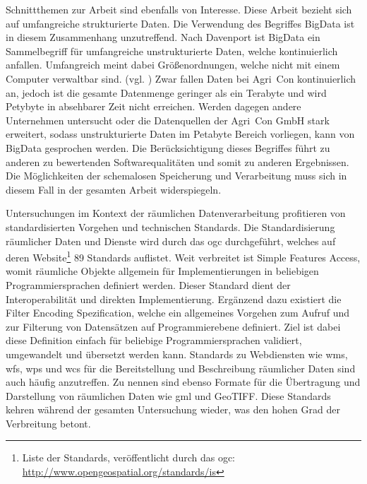 Schnittthemen zur Arbeit sind ebenfalls von Interesse.
Diese Arbeit bezieht sich auf umfangreiche strukturierte Daten.
Die Verwendung des Begriffes BigData ist in diesem Zusammenhang unzutreffend.
Nach Davenport ist BigData ein Sammelbegriff für umfangreiche unstrukturierte Daten, welche kontinuierlich anfallen.
Umfangreich meint dabei Größenordnungen, welche nicht mit einem Computer verwaltbar sind. (vgl. \cite[S.1]{book:bigdata})
Zwar fallen Daten bei Agri~Con kontinuierlich an, jedoch ist die gesamte Datenmenge geringer als ein Terabyte und wird Petybyte in absehbarer Zeit nicht erreichen.
Werden dagegen andere Unternehmen untersucht oder die Datenquellen der Agri~Con GmbH stark erweitert, sodass unstrukturierte Daten im Petabyte Bereich vorliegen, kann von BigData gesprochen werden.
Die Berücksichtigung dieses Begriffes führt zu anderen zu bewertenden Softwarequalitäten und somit zu anderen Ergebnissen.
Die Möglichkeiten der schemalosen Speicherung und Verarbeitung muss sich in diesem Fall in der gesamten Arbeit widerspiegeln.

Untersuchungen im Kontext der räumlichen Datenverarbeitung profitieren von standardisierten Vorgehen und technischen Standards.
Die Standardisierung räumlicher Daten und Dienste wird durch das \Gls{ogc} durchgeführt, welches auf deren Website\footnote{Liste der Standards, veröffentlicht durch das \Gls{ogc}: \url{http://www.opengeospatial.org/standards/is}} 89 Standards auflistet.
Weit verbreitet ist Simple Features Access, womit räumliche Objekte allgemein für Implementierungen in beliebigen Programmiersprachen definiert werden.
Dieser Standard dient der Interoperabilität und direkten Implementierung.
Ergänzend dazu existiert die Filter Encoding Spezification, welche ein allgemeines Vorgehen zum Aufruf und zur Filterung von Datensätzen auf Programmierebene definiert.
Ziel ist dabei diese Definition einfach für beliebige Programmiersprachen validiert, umgewandelt und übersetzt werden kann.
Standards zu Webdiensten wie \Gls{wms}, \Gls{wfs}, \Gls{wps} und \Gls{wcs} für die Bereitstellung und Beschreibung räumlicher Daten sind auch häufig anzutreffen.
Zu nennen sind ebenso Formate für die Übertragung und Darstellung von räumlichen Daten wie \Gls{gml} und GeoTIFF.
Diese Standards kehren während der gesamten Untersuchung wieder, was den hohen Grad der Verbreitung betont.

